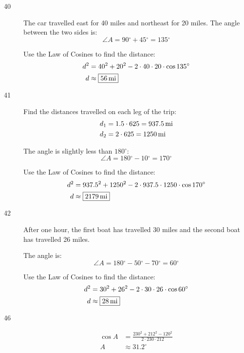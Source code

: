 \documentclass{exam}
\newcommand{\dg}{\ensuremath{^\circ}}
\begin{document}
\begin{description}
      \item[40]
        The car travelled east for 40 miles and northeast for 20 miles.  The angle between the two sides is:
        \[
          \angle A = 90 \dg + 45 \dg = 135 \dg
        \]

        Use the Law of Cosines to find the distance:
        \begin{align*}
          d^2 & = 40^2 + 20^2 - 2 \cdot 40 \cdot 20 \cdot \cos 135 \dg \\
          d   & \approx \boxed{ \unit[56]{mi} } \\
        \end{align*}

      \item[41]
        Find the distances travelled on each leg of the trip:
        \begin{align*}
          d_1 &= 1.5 \cdot 625 = \unit[937.5]{mi} \\
          d_2 &= 2 \cdot 625 = \unit[1250]{mi} \\
        \end{align*}

        The angle is slightly less than $180 \dg$:
        \[
          \angle A = 180 \dg - 10 \dg = 170 \dg
        \]

        Use the Law of Cosines to find the distance:
        \begin{align*}
          d^2 & = 937.5^2 + 1250^2 - 2 \cdot 937.5 \cdot 1250 \cdot \cos 170 \dg \\
          d   & \approx \boxed{ \unit[2179]{mi} } \\
        \end{align*}

      \item[42]
        After one hour, the first boat has travelled 30 miles and the second boat has travelled 26 miles.

        The angle is:
        \[
          \angle A = 180 \dg - 50 \dg - 70 \dg = 60 \dg
        \]

        Use the Law of Cosines to find the distance:
        \begin{align*}
          d^2 & = 30^2 + 26^2 - 2 \cdot 30 \cdot 26 \cdot \cos 60 \dg \\
          d   & \approx \boxed{ \unit[28]{mi} } \\
        \end{align*}

      \item[46]
        \begin{align*}
          \cos A & = \frac{230^2 + 212^2 - 120^2}{2 \cdot 230 \cdot 212} \\
          A      & \approx 31.2 \dg \\
        \end{align*}


\end{description}
\end{document}
